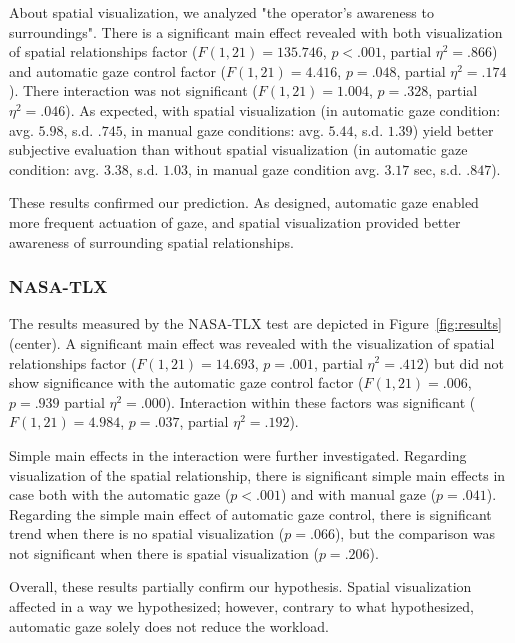 \documentclass[journal]{IEEEtran}
\begin{document}
About spatial visualization, we analyzed "the operator's awareness to  surroundings". 
There is a significant main effect revealed with both visualization of spatial relationships factor ($F(1,21)=135.746$, $p<.001$, partial $\eta^2 = .866$) and automatic gaze control factor ($F(1,21)=4.416$, $p=.048$, partial $\eta^2 = .174$).
There interaction was not significant ($F(1,21)=1.004$, $p=.328$, partial $\eta^2 = .046$).
As expected, with spatial visualization (in automatic gaze condition: avg. $5.98$, s.d. $.745$, in manual gaze conditions: avg. $5.44$, s.d. $1.39$) yield better subjective evaluation than without spatial visualization (in automatic gaze condition: avg. $3.38$, s.d. $1.03$, in manual gaze condition avg. $3.17$ sec, s.d. $.847$). 

These results confirmed our prediction. As designed, automatic gaze enabled more frequent actuation of gaze, and spatial visualization provided better awareness of surrounding spatial relationships.


\subsubsection{NASA-TLX}
The results measured by the NASA-TLX test are depicted in Figure~\ref{fig:results} (center).
A significant main effect was revealed with the visualization of spatial relationships factor ($F(1,21)=14.693$, $p=.001$, partial $\eta^2=.412$) but did not show significance with the automatic gaze control factor ($F(1,21)=.006$, $p=.939$ partial $\eta^2=.000$).
Interaction within these factors was significant ($F(1,21)=4.984$, $p=.037$, partial $\eta^2=.192$).

Simple main effects in the interaction were further investigated.  
Regarding visualization of the spatial relationship, there is significant simple main effects in case both with the automatic gaze ($p<.001$) and with manual gaze ($p=.041$). 
Regarding the simple main effect of automatic gaze control, there is significant trend when there is no spatial visualization ($p=.066$), but the comparison was not significant when there is spatial visualization ($p=.206$).

Overall, these results partially confirm our hypothesis. Spatial visualization affected in a way we hypothesized; however, contrary to what hypothesized, automatic gaze solely does not reduce the workload.
 

\end{document}
